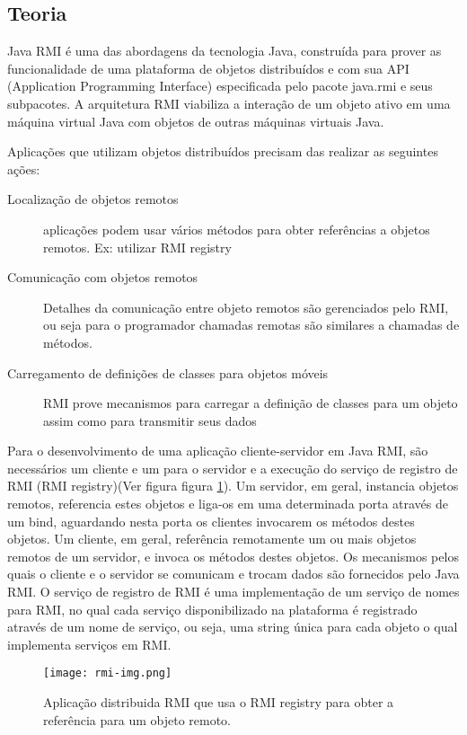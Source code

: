 \documentclass[10pt,a4paper]{article}
\begin{document}
\subsection{Teoria}
Java RMI é uma das abordagens da tecnologia Java, construída para prover as
funcionalidade de uma plataforma de objetos distribuídos e com sua API (Application
Programming Interface) especificada pelo pacote java.rmi e seus subpacotes. A
arquitetura RMI viabiliza a interação de um objeto ativo em uma máquina virtual Java com
objetos de outras máquinas virtuais Java.

Aplicações que utilizam objetos distribuídos precisam das realizar as seguintes ações:
\begin{description}
\item[Localização de objetos remotos] aplicações podem usar vários
  métodos para obter referências a objetos remotos. Ex: utilizar  RMI registry
\item [Comunicação com objetos remotos] Detalhes da comunicação entre
  objeto remotos são gerenciados pelo RMI, ou seja para o programador
  chamadas remotas são similares a chamadas de métodos.
\item [Carregamento de definições de classes para objetos móveis]
  RMI prove mecanismos para carregar a definição de classes para um
  objeto assim como para transmitir seus dados
\end{description}

Para o desenvolvimento de uma aplicação cliente-servidor em Java RMI, são
necessários um cliente e um para o servidor e a
execução do serviço de registro de RMI (RMI registry)(Ver figura
figura \ref{f1}). Um servidor, em geral, instancia
objetos remotos, referencia estes objetos e liga-os em uma determinada porta através de
um bind, aguardando nesta porta os clientes invocarem os métodos destes objetos. Um
cliente, em geral, referência remotamente um ou mais objetos remotos de um servidor, e
invoca os métodos destes objetos. Os mecanismos pelos quais o cliente e o servidor se
comunicam e trocam dados são fornecidos pelo Java RMI. O serviço de registro de RMI é
uma implementação de um serviço de nomes para RMI, no qual cada serviço
disponibilizado na plataforma é registrado através de um nome de serviço, ou seja, uma
string única para cada objeto o qual implementa serviços em RMI.

\begin{figure}[h!]
  \begin{center}
    \texttt{[image: rmi-img.png]}
    \caption{Aplicação distribuida RMI que usa o RMI registry para obter a
      referência para um objeto remoto.}
    \label{f1}
  \end{center}
\end{figure}
\end{document}
